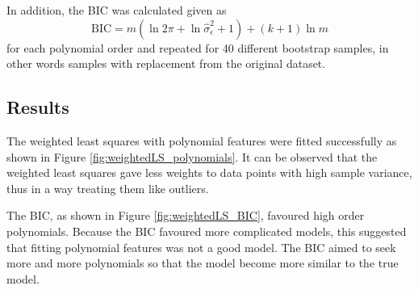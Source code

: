 \documentclass[12pt]{report}
\begin{document}
In addition, the BIC was calculated given as
\begin{equation}
\text{BIC} = m\left(\ln2\pi+\ln\widehat{\sigma}_\epsilon^2+1\right)+(k+1)\ln{m}
\end{equation}
for each polynomial order and repeated for 40 different bootstrap samples, in other words samples with replacement from the original dataset. 

\subsection{Results}
The weighted least squares with polynomial features were fitted successfully as shown in Figure \ref{fig:weightedLS_polynomials}. It can be observed that the weighted least squares gave less weights to data points with high sample variance, thus in a way treating them like outliers.

The BIC, as shown in Figure \ref{fig:weightedLS_BIC}, favoured high order polynomials. Because the BIC favoured more complicated models, this suggested that fitting polynomial features was not a good model. The BIC aimed to seek more and more polynomials so that the model become more similar to the true model. 
\end{document}
